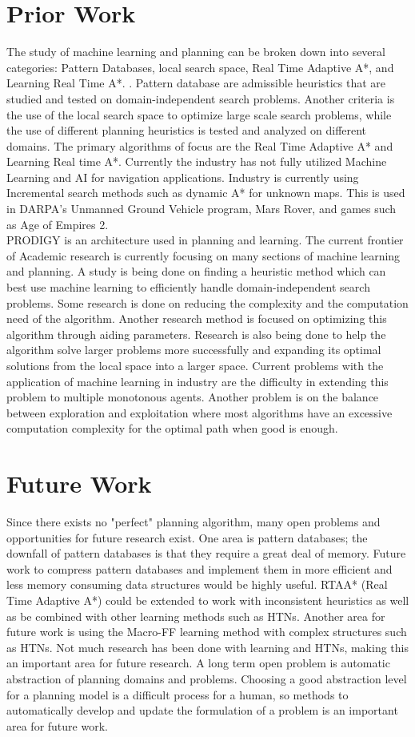 \documentclass[tog]{acmsiggraph}
\begin{document}
\section{Prior Work}
\indent The study of machine learning and planning can be broken down into several categories: Pattern Databases, local search space, Real Time Adaptive A*, and Learning Real Time A*. . Pattern database are admissible heuristics that are studied and tested on domain-independent search problems. Another criteria is the use of the local search space to optimize large scale search problems, while the use of different planning heuristics is tested and analyzed on different domains. The primary algorithms of focus are the Real Time Adaptive A* and Learning Real time A*. Currently the industry has not fully utilized Machine Learning and AI for navigation applications. Industry is currently using Incremental search methods such as dynamic A* for unknown maps. This is used in DARPA’s Unmanned Ground Vehicle program, Mars Rover, and games such as Age of Empires 2. 
\\
\indent PRODIGY is an architecture used in planning and learning. The current frontier of Academic research is currently focusing on many sections of machine learning and planning. A study is being done on finding a heuristic method which can best use machine learning to efficiently handle domain-independent search problems. Some research is done on reducing the complexity and the computation need of the algorithm. Another research method is focused on optimizing this algorithm through aiding parameters. Research is also being done to help the algorithm solve larger problems more successfully and expanding its optimal solutions from the local space into a larger space. Current problems with the application of machine learning in industry are the difficulty in extending this problem to multiple monotonous agents. Another problem is on the balance between exploration and exploitation where most algorithms have an excessive computation complexity for the optimal path when good is enough.
\section{Future Work}
\indent Since there exists no "perfect" planning algorithm, many open problems and opportunities for future research exist. One area is pattern databases; the downfall of pattern databases is that they require a great deal of memory. Future work to compress pattern databases and implement them in more efficient and less memory consuming data structures would be highly useful. RTAA* (Real Time Adaptive A*) could be extended to work with inconsistent heuristics as well as be combined with other learning methods such as HTNs. Another area for future work is using the Macro-FF learning method with complex structures such as HTNs. Not much research has been done with learning and HTNs, making this an important area for future research. A long term open problem is automatic abstraction of planning domains and problems. Choosing a good abstraction level for a planning model is a difficult process for a human, so methods to automatically develop and update the formulation of a problem is an important area for future work.
\end{document}
